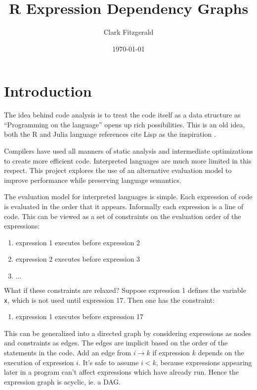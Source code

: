 \documentclass[12pt]{article}
\begin{document}
\title{R Expression Dependency Graphs}
\date{\today}
\author{Clark Fitzgerald}
\maketitle

\begin{abstract}

\end{abstract}

\section{Introduction}

The idea behind code analysis is to treat the code itself as a data
structure as ``Programming on the language'' opens up rich possibilities.
This is an old idea, both the R and Julia language references cite Lisp
as the inspiration \cite{Rlang} \cite{bezanson2014julia}.

Compilers have used all manners of static analysis and
intermediate optimizations to create more efficient code. Interpreted
languages are much more limited in this respect. This project explores
the use of an alternative evaluation model to improve performance while
preserving language semantics.

The evaluation model for interpreted languages is simple. Each
expression of code is evaluated in the order that it appears. Informally
each expression is a line of code. This can be
viewed as a set of constraints on the evaluation order of the expressions:
\begin{enumerate}
    \item expression 1 executes before expression 2
    \item expression 2 executes before expression 3
    \item $\dots$
\end{enumerate}
What if these constraints are relaxed? Suppose expression 1 defines the variable
\texttt{x}, which is not used until expression 17. Then one has the
constraint:
\begin{enumerate}
    \item expression 1 executes before expression 17
\end{enumerate}
This can be generalized into a directed graph by considering expressions as
nodes and constraints as edges. The edges are implicit based on the order
of the statements in the code. Add an edge from $i \rightarrow k$ if
expression $k$ depends on the execution of expression $i$.  It's safe to
assume $i < k$, because expressions appearing later in a program can't
affect expressions which have already run. Hence the expression graph is
acyclic, ie. a DAG.
\end{document}
